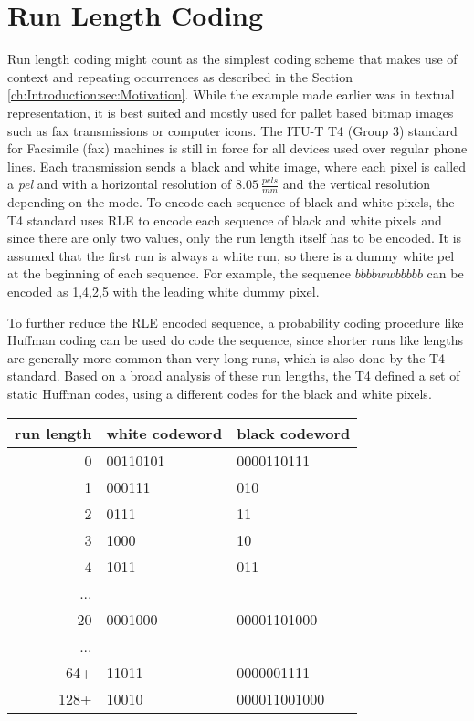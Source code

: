 \section{Run Length Coding}
\label{ch:Principles of compression:sec:Run Length Encoding}

\par{
Run length coding might count as the simplest coding scheme that makes use of context and repeating occurrences as described in the Section \ref{ch:Introduction:sec:Motivation}. While the example made earlier was in textual representation, it is best suited and mostly used for pallet based bitmap images \cite{palette-image} such as fax transmissions or computer icons. The ITU-T T4 (Group 3) standard for Facsimile (fax) machines \cite{ITU} is still in force for all devices used over regular phone lines. Each transmission sends a black and white image, where each pixel is called a \textit{pel} and with a horizontal resolution of $8.05 \: \frac{pels}{mm}$ and the vertical resolution depending on the mode. To encode each sequence of black and white pixels, the T4 standard uses RLE to encode each sequence of black and white pixels and since there are only two values, only the run length itself has to be encoded. It is assumed that the first run is always a white run, so there is a dummy white pel at the beginning of each sequence. For example, the sequence $bbbbwwbbbbb$ can be encoded as 1,4,2,5 with the leading white dummy pixel.
}

\par{
To further reduce the RLE encoded sequence, a probability coding procedure like Huffman coding can be used do code the sequence, since shorter runs like lengths are generally more common than very long runs, which is also done by the T4 standard. Based on a broad analysis of these run lengths, the T4 defined a set of static Huffman codes, using a different codes for the black and white pixels.
}
\begin{center}
	\begin{tabular}[p]{r|l|l}
		
		run length &  white codeword & black codeword\\
		\hline
		0 &  00110101 & 0000110111\\
		1 & 000111 & 010\\
		2 & 0111 & 11\\
		3 & 1000 & 10\\
		4 & 1011 & 011\\
		... &  & \\
		20 & 0001000 & 00001101000\\
		... & & \\
		64+ & 11011 & 0000001111\\
		128+ & 10010 & 000011001000
		\label{tab:t4 run length Huffman codes}
	\end{tabular}
\end{center}

